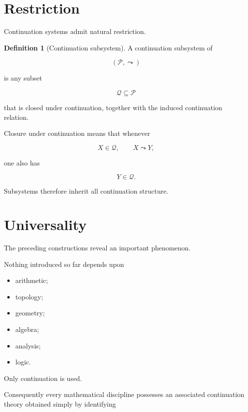\documentclass[13pt,openany]{book}
\theoremstyle{plain}
\theoremstyle{definition}
\newtheorem{definition}{Definition}[chapter]
\begin{document}
\section{Restriction}

Continuation systems admit natural restriction.

\begin{definition}[Continuation subsystem]
A continuation subsystem of

\[
(\mathcal P,\leadsto)
\]

is any subset

\[
\mathcal Q\subseteq\mathcal P
\]

that is closed under continuation, together with the induced continuation
relation.
\end{definition}

Closure under continuation means that whenever

\[
X\in\mathcal Q,
\qquad
X\leadsto Y,
\]

one also has

\[
Y\in\mathcal Q.
\]

Subsystems therefore inherit all continuation structure.

\section{Universality}

The preceding constructions reveal an important phenomenon.

Nothing introduced so far depends upon

\begin{itemize}
\item arithmetic;
\item topology;
\item geometry;
\item algebra;
\item analysis;
\item logic.
\end{itemize}

Only continuation is used.

Consequently every mathematical discipline possesses an associated
continuation theory obtained simply by identifying
\end{document}
